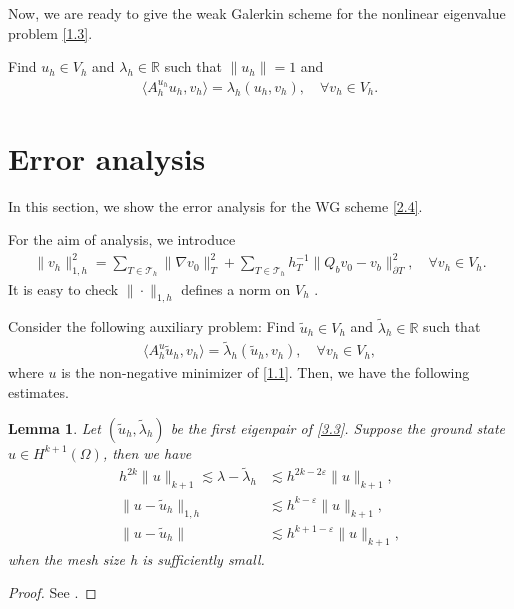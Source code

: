\documentclass[compress, preprint,9pt]{elsarticle}
\numberwithin{equation}{section}
\newtheorem{lemma}{Lemma}[section]
\newcommand{\sumT}{\sum_{T\in\mathcal{T}_h}}     %
\newcommand{\eps}{\varepsilon}
\newcommand{\Real}{\mathbb{R}}
\newcommand{\la}{\langle}
\newcommand{\ran}{\rangle}
\begin{document}
	Now, we are ready to give the weak Galerkin scheme for the nonlinear eigenvalue problem \eqref{1.3}.
	\begin{algorithm}[ht!]
		\caption{The weak Galerkin scheme for \eqref{1.3}.}
		Find $ u_h\in V_h$ and $\lambda_h\in\Real$ such that $\| u_h\|=1$ and
		\begin{eqnarray}\label{2.4}
			\la A_h^{u_h} u_h, v_h\ran=\lambda_h(u_h,v_h),\quad\forall  v_h\in V_h.
		\end{eqnarray}
	\end{algorithm}

\section{Error analysis}In this section, we show the error analysis for the WG scheme \eqref{2.4}.

For the aim of analysis, we introduce
\begin{eqnarray*}
	\|v_h\|_{1,h}^2=\sumT\|\nabla v_0\|_T^2+\sumT h_T^{-1}\|  Q_bv_0- v_b\|_{\partial T}^2,\quad\forall v_h\in V_h.
\end{eqnarray*}
It is easy to check $\|\cdot\|_{1,h}$ defines a norm on $V_h$ \cite{Zhai2019c,Wang2017b}.

Consider the following auxiliary problem: Find $\widetilde{u}_h\in V_h$ and $\widetilde{\lambda}_h\in\Real$ such that
\begin{eqnarray}\label{3.3}
	\la A_h^{u} \widetilde{u}_h, v_h\ran=\widetilde{\lambda}_h(\widetilde{u}_h,v_h),\quad\forall  v_h\in V_h,
\end{eqnarray}
where $u$ is the non-negative minimizer of \eqref{1.1}. Then, we have the following estimates.
\begin{lemma}\label{lem7}
	Let $(\widetilde{u}_h,\widetilde{\lambda}_h)$ be the first eigenpair of \eqref{3.3}. Suppose the ground state $u\in H^{k+1}(\Omega)$, then we have
	\begin{eqnarray}
		h^{2k}\|u\|_{k+1}\lesssim\lambda-\widetilde{\lambda}_h&\lesssim h^{2k-2\eps}\|u\|_{k+1},\label{3.4}
		\\
		\|u-\widetilde{u}_h\|_{1,h}&\lesssim h^{k-\eps}\|u\|_{k+1},\label{3.5}
		\\
		\|u-\widetilde{u}_h\|&\lesssim h^{k+1-\eps}\|u\|_{k+1},\label{3.6}
	\end{eqnarray}
	when the mesh size h is sufficiently small.
\end{lemma}
\begin{proof}
	See \cite{Zhai2019c}.
\end{proof}
\end{document}
